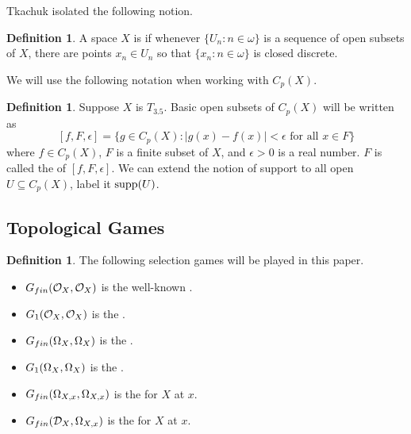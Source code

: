 \documentclass{amsart}
\theoremstyle{plain}
\theoremstyle{definition}
\newtheorem{definition}[theorem]{Definition}
\theoremstyle{remark}
\theoremstyle{plain}
\theoremstyle{definition}
\theoremstyle{remark}
\begin{document}
Tkachuk isolated the following notion\cite{Tkachuk2}.

\begin{definition}
 A space \(X\) is  if whenever \(\{U_n : n \in \omega\}\) is a sequence of open subsets of \(X\), there are points \(x_n \in U_n\) so that \(\{x_n : n \in \omega\}\) is closed discrete.
\end{definition}

We will use the following notation when working with \(C_p(X)\).

\begin{definition}
 Suppose \(X\) is \(T_{3.5}\).
 Basic open subsets of \(C_p(X)\) will be written as
 \[
  [f,F,\epsilon] = \{g\in C_p(X):|g(x)-f(x)|<\epsilon\text{ for all }x\in F\}
 \]
 where \(f \in C_p(X)\), \(F\) is a finite subset of \(X\), and \(\epsilon > 0\) is a real number.
 \(F\) is called the  of \([f,F,\epsilon]\).
 We can extend the notion of support to all open \(U \subseteq C_p(X)\), label it \(\textrm{supp}(U)\).
\end{definition}

\subsection{Topological Games}

\begin{definition}
 The following selection games will be played in this paper.
 \begin{itemize}
   \item \(G_{fin}(\mathcal{O}_X,\mathcal{O}_X)\) is the well-known .
   \item \(G_{1}(\mathcal{O}_X,\mathcal{O}_X)\) is the .
   \item \(G_{fin}(\Omega_X,\Omega_X)\) is the .
   \item \(G_{1}(\Omega_X,\Omega_X)\) is the .
   \item \(G_{fin}(\Omega_{X,x},\Omega_{X,x})\) is the  for \(X\) at \(x\).
   \item \(G_{fin}(\mathcal{D}_X,\Omega_{X,x})\) is the  for \(X\) at \(x\).
 \end{itemize}
\end{definition}
  
\end{document}
